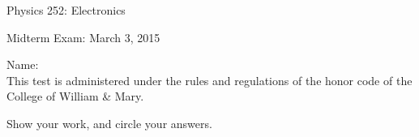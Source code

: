 \documentclass[letterpaper,addpoints,answers]{exam}
\begin{document}
\begin{coverpages}
 \large\bfseries
 
 \noindent 
 Physics 252: Electronics
 
 \vspace{2ex}
 \noindent
 Midterm Exam: March 3, 2015

 \vspace{5ex}
 \noindent 
 Name:\enspace\makebox[2in]{\hrulefill}\\

 \vspace{5ex}
 \noindent 
 This test is administered under the rules and regulations of the honor 
 code of the College of William \& Mary.  

 \vspace{5ex}
 \noindent 
 Show your work, and circle your answers.
 
 \pagebreak
 \vspace{5ex}
 \begin{center}
  \combinedgradetable[v][questions]
 \end{center}
\end{coverpages}
 
\end{document}
